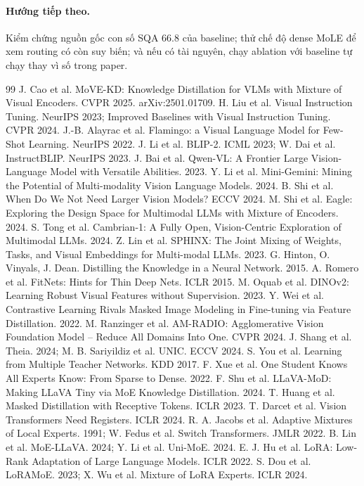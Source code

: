 \documentclass[11pt,a4paper]{article}
\begin{document}
\paragraph{Hướng tiếp theo.} Kiểm chứng nguồn gốc con số SQA 66.8 của baseline; thử chế độ dense MoLE để xem routing có còn suy biến; và nếu có tài nguyên, chạy ablation với baseline tự chạy thay vì số trong paper.

\begin{thebibliography}{99}\small
{} J. Cao et al. MoVE-KD: Knowledge Distillation for VLMs with Mixture of Visual Encoders. CVPR 2025. arXiv:2501.01709.
 H. Liu et al. Visual Instruction Tuning. NeurIPS 2023; Improved Baselines with Visual Instruction Tuning. CVPR 2024.
 J.-B. Alayrac et al. Flamingo: a Visual Language Model for Few-Shot Learning. NeurIPS 2022.
 J. Li et al. BLIP-2. ICML 2023; W. Dai et al. InstructBLIP. NeurIPS 2023.
 J. Bai et al. Qwen-VL: A Frontier Large Vision-Language Model with Versatile Abilities. 2023.
 Y. Li et al. Mini-Gemini: Mining the Potential of Multi-modality Vision Language Models. 2024.
 B. Shi et al. When Do We Not Need Larger Vision Models? ECCV 2024.
 M. Shi et al. Eagle: Exploring the Design Space for Multimodal LLMs with Mixture of Encoders. 2024.
 S. Tong et al. Cambrian-1: A Fully Open, Vision-Centric Exploration of Multimodal LLMs. 2024.
 Z. Lin et al. SPHINX: The Joint Mixing of Weights, Tasks, and Visual Embeddings for Multi-modal LLMs. 2023.
 G. Hinton, O. Vinyals, J. Dean. Distilling the Knowledge in a Neural Network. 2015.
 A. Romero et al. FitNets: Hints for Thin Deep Nets. ICLR 2015.
 M. Oquab et al. DINOv2: Learning Robust Visual Features without Supervision. 2023.
 Y. Wei et al. Contrastive Learning Rivals Masked Image Modeling in Fine-tuning via Feature Distillation. 2022.
 M. Ranzinger et al. AM-RADIO: Agglomerative Vision Foundation Model -- Reduce All Domains Into One. CVPR 2024.
 J. Shang et al. Theia. 2024; M. B. Sariyildiz et al. UNIC. ECCV 2024.
 S. You et al. Learning from Multiple Teacher Networks. KDD 2017.
 F. Xue et al. One Student Knows All Experts Know: From Sparse to Dense. 2022.
 F. Shu et al. LLaVA-MoD: Making LLaVA Tiny via MoE Knowledge Distillation. 2024.
 T. Huang et al. Masked Distillation with Receptive Tokens. ICLR 2023.
 T. Darcet et al. Vision Transformers Need Registers. ICLR 2024.
 R. A. Jacobs et al. Adaptive Mixtures of Local Experts. 1991; W. Fedus et al. Switch Transformers. JMLR 2022.
 B. Lin et al. MoE-LLaVA. 2024; Y. Li et al. Uni-MoE. 2024.
 E. J. Hu et al. LoRA: Low-Rank Adaptation of Large Language Models. ICLR 2022.
 S. Dou et al. LoRAMoE. 2023; X. Wu et al. Mixture of LoRA Experts. ICLR 2024.
\end{thebibliography}
\end{document}
